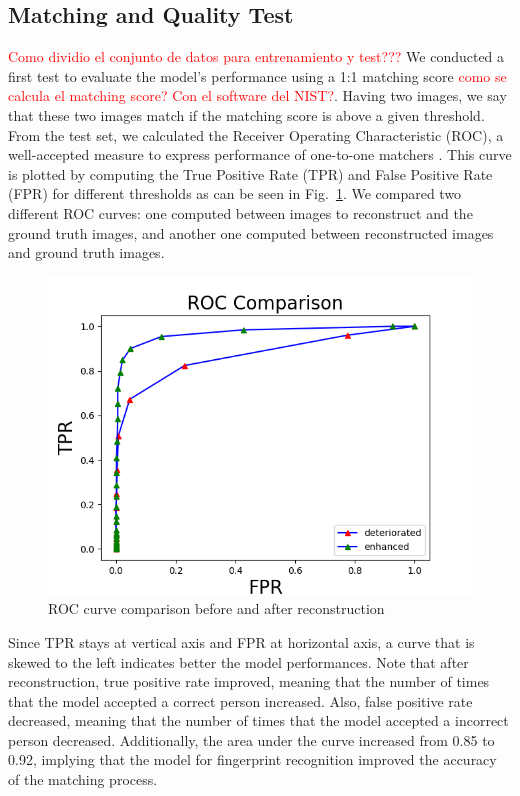 \documentclass[a4paper,fleqn]{cas-dc}
\begin{document}
\subsection{Matching and Quality Test}
\textcolor{red}{Como dividio el conjunto de datos para entrenamiento y test???}
We conducted a first test to evaluate the model's performance using a 1:1 matching score \textcolor{red}{como se calcula el matching score? Con el software del NIST?}. Having two images, we say that these two images match if the matching score is above a given threshold. From the test set, we calculated the Receiver Operating Characteristic (ROC), a well-accepted measure to express performance of one-to-one matchers \cite{RROCCMC}. This curve is plotted by computing the True Positive Rate (TPR) and False Positive Rate (FPR) for different thresholds as can be seen in Fig.~\ref{fig9}. We compared two different ROC curves: one computed between images to reconstruct and the ground truth images, and another one computed between reconstructed images and ground truth images. 
\begin{figure}[!ht]
\centerline{\includegraphics[scale=0.5]{figs/roc_comparison.png}}
\caption{ROC curve comparison before and after reconstruction}
\label{fig9}
\end{figure}
Since TPR stays at vertical axis and FPR at horizontal axis, a curve that is skewed to the left indicates better the model performances. Note that after reconstruction, true positive rate improved, meaning that the number of times that the model accepted a correct person increased. Also, false positive rate decreased,  meaning that the number of times that the model accepted a incorrect person decreased. Additionally, the area under the curve increased from 0.85 to 0.92, implying that the model for fingerprint recognition improved the accuracy of the matching process.
\end{document}
